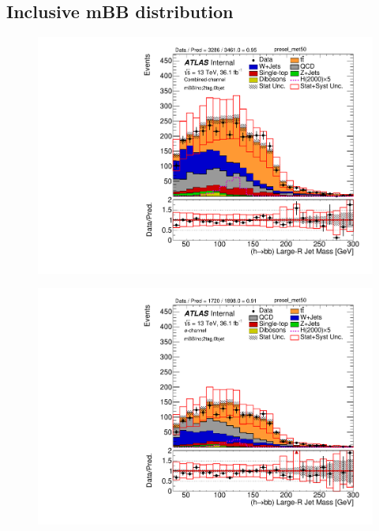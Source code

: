 \subsection{Inclusive mBB distribution}


\begin{figure}[!h]
\begin{center}
\includegraphics[scale=0.33]{./figures/boosted/mBBInc/Unblinded/DataMC_2tag_0bjet_Inc_lepton_presel_met50_HbbMass}\\
\par\medskip
\includegraphics[scale=0.33]{./figures/boosted/mBBInc/Unblinded/DataMC_2tag_0bjet_Inc_elec_presel_met50_HbbMass}

\end{center}
\end{figure}
